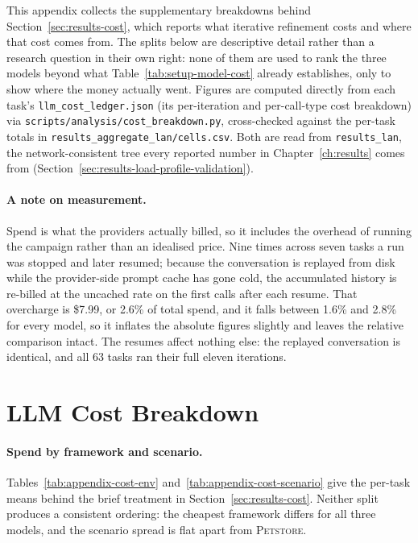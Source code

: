 \label{ch:appendix-additional-results}

This appendix collects the supplementary breakdowns behind
Section~\ref{sec:results-cost}, which reports what iterative refinement
costs and where that cost comes from. The splits below are descriptive
detail rather than a research question in their own right: none of them
are used to rank the three models beyond what
Table~\ref{tab:setup-model-cost} already establishes, only to show where
the money actually went. Figures are computed directly from each task's
\texttt{llm\_cost\_ledger.json} (its per-iteration and per-call-type cost
breakdown) via \texttt{scripts/analysis/cost\_breakdown.py}, cross-checked
against the per-task totals in
\texttt{results\_aggregate\_lan/cells.csv}. Both are read from
\texttt{results\_lan}, the network-consistent tree every reported number
in Chapter~\ref{ch:results} comes from
(Section~\ref{sec:results-load-profile-validation}).

\paragraph{A note on measurement.} Spend is what the providers actually
billed, so it includes the overhead of running the campaign rather than an
idealised price. Nine times across seven tasks a run was stopped and later
resumed; because the conversation is replayed from disk while the
provider-side prompt cache has gone cold, the accumulated history is
re-billed at the uncached rate on the first calls after each resume. That
overcharge is \$7.99, or 2.6\% of total spend, and it falls between 1.6\%
and 2.8\% for every model, so it inflates the absolute figures slightly and
leaves the relative comparison intact. The resumes affect nothing else:
the replayed conversation is identical, and all 63 tasks ran their full
eleven iterations.

\section{LLM Cost Breakdown}
\label{sec:appendix-cost}

\paragraph{Spend by framework and scenario.} Tables~\ref{tab:appendix-cost-env}
and~\ref{tab:appendix-cost-scenario} give the per-task means behind the
brief treatment in Section~\ref{sec:results-cost}. Neither split produces a
consistent ordering: the cheapest framework differs for all three models,
and the scenario spread is flat apart from \textsc{Petstore}.

